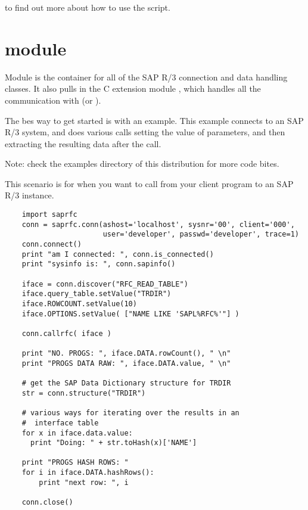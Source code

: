 \documentclass{howto}
\begin{document}
to find out more about how to use the script.


\section{module  \label{modsaprfc}}


Module  is the container for all of the SAP R/3 connection
and data handling classes.  It also pulls in the C extension module
, which handles all the communication with  (or ).

The bes way to get started is with an example.  This example connects
to an SAP R/3 system, and does various calls setting the value of parameters,
and then extracting the resulting data after the call.

Note: check the examples directory of this distribution for more code bites.



This scenario is for when you want to call from your client program to an SAP R/3 instance.


\begin{verbatim}
	import saprfc
	conn = saprfc.conn(ashost='localhost', sysnr='00', client='000',
	                   user='developer', passwd='developer', trace=1)
	conn.connect()
	print "am I connected: ", conn.is_connected()
	print "sysinfo is: ", conn.sapinfo()

	iface = conn.discover("RFC_READ_TABLE")
	iface.query_table.setValue("TRDIR")
	iface.ROWCOUNT.setValue(10)
	iface.OPTIONS.setValue( ["NAME LIKE 'SAPL%RFC%'"] )

	conn.callrfc( iface )

	print "NO. PROGS: ", iface.DATA.rowCount(), " \n"
	print "PROGS DATA RAW: ", iface.DATA.value, " \n"

	# get the SAP Data Dictionary structure for TRDIR
	str = conn.structure("TRDIR")

	# various ways for iterating over the results in an
	#  interface table
	for x in iface.data.value:
	  print "Doing: " + str.toHash(x)['NAME']

	print "PROGS HASH ROWS: "
	for i in iface.DATA.hashRows():
		print "next row: ", i

	conn.close()
\end{verbatim}
\end{document}
